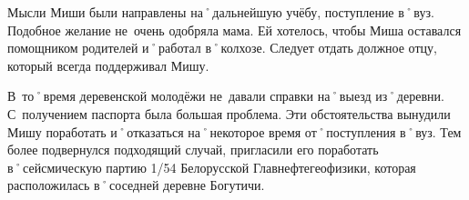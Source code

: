 Мысли Миши были направлены на˚дальнейшую учёбу, поступление в˚вуз. Подобное желание не~очень одобряла мама. Ей хотелось, чтобы Миша оставался помощником родителей и˚работал в˚колхозе. Следует отдать должное отцу, который всегда поддерживал Мишу. 

В~то˚время деревенской молодёжи не~давали справки на˚выезд из˚деревни. С~получением паспорта была большая проблема. Эти обстоятельства вынудили Мишу поработать и˚отказаться на˚некоторое время от˚поступления в˚вуз. Тем более подвернулся подходящий случай, пригласили его поработать в˚сейсмическую партию 1/54 Белорусской Главнефтегеофизики, которая расположилась в˚соседней деревне Богутичи.

